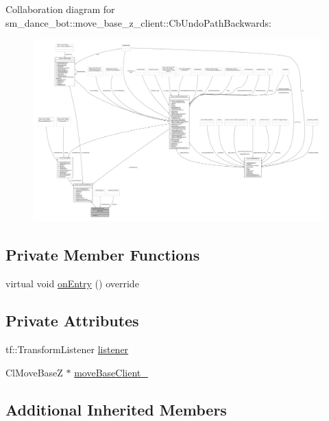 Collaboration diagram for sm\+\_\+dance\+\_\+bot\+:\+:move\+\_\+base\+\_\+z\+\_\+client\+:\+:Cb\+Undo\+Path\+Backwards\+:
\nopagebreak
\begin{figure}[H]
\begin{center}
\leavevmode
\includegraphics[width=350pt]{classsm__dance__bot_1_1move__base__z__client_1_1CbUndoPathBackwards__coll__graph}
\end{center}
\end{figure}
\subsection*{Private Member Functions}
\begin{DoxyCompactItemize}
\item 
virtual void \hyperlink{classsm__dance__bot_1_1move__base__z__client_1_1CbUndoPathBackwards_a4d5ae7f19351854449c4ba7f2f83d462}{on\+Entry} () override
\end{DoxyCompactItemize}
\subsection*{Private Attributes}
\begin{DoxyCompactItemize}
\item 
tf\+::\+Transform\+Listener \hyperlink{classsm__dance__bot_1_1move__base__z__client_1_1CbUndoPathBackwards_a0435bdc608b904ec465a82ad16d9fbdb}{listener}
\item 
Cl\+Move\+BaseZ $\ast$ \hyperlink{classsm__dance__bot_1_1move__base__z__client_1_1CbUndoPathBackwards_a1f7d4e9c10eac4bef3f729967daf49d2}{move\+Base\+Client\+\_\+}
\end{DoxyCompactItemize}
\subsection*{Additional Inherited Members}


